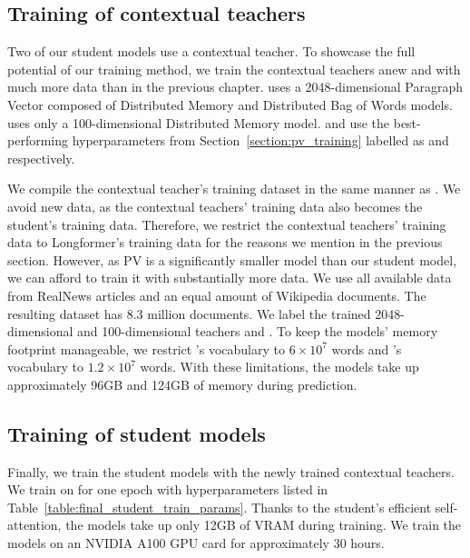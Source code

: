 \subsection{Training of contextual teachers}

Two of our student models use a contextual teacher. To showcase the full
potential of our training method, we train the contextual teachers anew and
with much more data than in the previous chapter. {\CosineStudent} uses a
2048-dimensional Paragraph Vector \citep{le2014distributed} composed of
Distributed Memory and Distributed Bag of Words models. {\MSEStudent} uses only
a 100-dimensional Distributed Memory model. {\CosineStudent} and {\MSEStudent}
use the best-performing hyperparameters from Section~\ref{section:pv_training}
labelled as  and  respectively.

We compile the contextual teacher's training dataset in the same manner as
. We avoid new data, as the contextual teachers' training
data also becomes the student's training data. Therefore, we restrict the
contextual teachers' training data to Longformer's training data for the
reasons we mention in the previous section. However, as PV is a significantly
smaller model than our student model, we can afford to train it with
substantially more data. We use all available data from RealNews articles and
an equal amount of Wikipedia documents. The resulting dataset has 8.3 million
documents. We label the trained 2048-dimensional and 100-dimensional teachers
 and . To keep the models' memory footprint manageable, we
restrict 's vocabulary to $6\times 10^7$ words and 's
vocabulary to $1.2\times 10^7$ words. With these limitations, the models take
up approximately 96GB and 124GB of memory during prediction.

\subsection{Training of student models}

Finally, we train the student models with the newly trained contextual teachers.
We train on  for one epoch with hyperparameters listed in
Table~\ref{table:final_student_train_params}. Thanks to the student's efficient
self-attention, the models take up only 12GB of VRAM during training. We train
the models on an NVIDIA A100 GPU card for approximately 30 hours.

